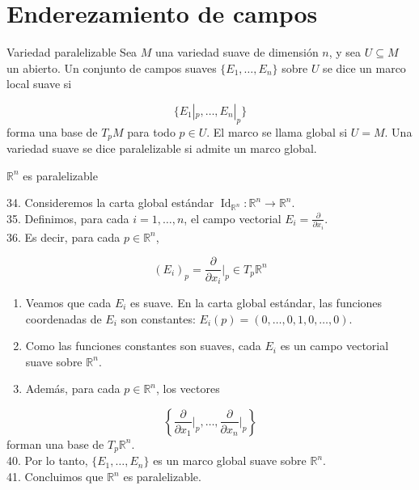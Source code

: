 \chapter{Enderezamiento de campos}
\label{ch:teo-18}
\begin{bookdefinition}{Variedad paralelizable}
Sea $M$ una variedad suave de dimensión $n$, y sea $U\subseteq M$ un abierto. Un conjunto de campos suaves $\{E_1,\dots,E_n\}$ sobre $U$ se dice un marco local suave si

\[
\{E_1|_p,\dots,E_n|_p\}
\]
forma una base de $T_pM$ para todo $p\in U$. El marco se llama global si $U=M$. Una variedad suave se dice paralelizable si admite un marco global.

\end{bookdefinition}
\begin{bookexample}{}
$\mathbb{R}^{n}$ es paralelizable

\end{bookexample}
\begin{bookproof}{}
34. Consideremos la carta global estándar $\operatorname{Id}_{\mathbb R^n}:\mathbb R^n\to\mathbb R^n$.\\
35. Definimos, para cada $i=1,\dots,n$, el campo vectorial $E_i=\frac{\partial}{\partial x_{i}}$.\\
36. Es decir, para cada $p\in\mathbb R^n$,

\[
(E_i)_p=\frac{\partial}{\partial x_{i}}\bigg|_p\in T_p\mathbb R^n
\]
\begin{enumerate}[start=37]
\item Veamos que cada $E_i$ es suave. En la carta global estándar, las funciones coordenadas de $E_i$ son constantes: $E_i(p)=(0,\dots,0,1,0,\dots,0)$.
\item Como las funciones constantes son suaves, cada $E_i$ es un campo vectorial suave sobre $\mathbb R^n$.
\item Además, para cada $p\in\mathbb R^n$, los vectores
\end{enumerate}
\[
\left\{\frac{\partial}{\partial x_{1}}\bigg|_p,\dots,\frac{\partial}{\partial x_{n}}\bigg|_p\right\}
\]
forman una base de $T_p\mathbb R^n$.\\
40. Por lo tanto, $\{E_1,\dots,E_n\}$ es un marco global suave sobre $\mathbb R^n$.\\
41. Concluimos que $\mathbb R^n$ es paralelizable.

\bookqed
\end{bookproof}
